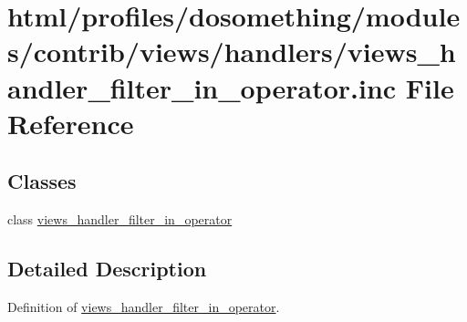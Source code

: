 \hypertarget{views__handler__filter__in__operator_8inc}{
\section{html/profiles/dosomething/modules/contrib/views/handlers/views\_\-handler\_\-filter\_\-in\_\-operator.inc File Reference}
\label{views__handler__filter__in__operator_8inc}
}
\subsection*{Classes}
\begin{DoxyCompactItemize}
\item 
class \hyperlink{classviews__handler__filter__in__operator}{views\_\-handler\_\-filter\_\-in\_\-operator}
\end{DoxyCompactItemize}


\subsection{Detailed Description}
Definition of \hyperlink{classviews__handler__filter__in__operator}{views\_\-handler\_\-filter\_\-in\_\-operator}. 